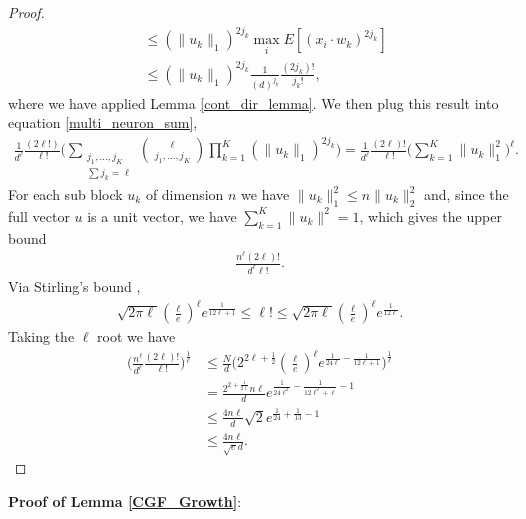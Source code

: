 \documentclass{article}
\numberwithin{equation}{section}
\theoremstyle{Lemma}
\theoremstyle{Corollary}
\theoremstyle{Theorem}
\theoremstyle{Remark}
\begin{document}
\begin{proof}
\begin{align}
     &\leq (\|u_{k}\|_{1})^{2j_{k}}\max_{i}E[(x_{i} \cdot w_{k})^{2j_{k}}]\\
     &\leq (\|u_{k}\|_{1})^{2j_{k}}
     \frac{1}{(d)^{j_{k}}}\frac{(2j_{k})!}{j_{k}!},
\end{align}
where we have applied Lemma \ref{cont_dir_lemma}. We then plug this result into equation \eqref{multi_neuron_sum},
\begin{align}
  \frac{1}{d^{\ell}}\frac{(2\ell!)}{\ell!}\Big(\sum_{\substack{j_{1}, \ldots, j_{K} \\ \sum j_{k} = \ell}}
  \binom{\ell}{j_{1},\ldots, j_{K}}\prod_{k=1}^{K}(\|u_{k}\|_{1})^{2j_{k}}\Big)=\frac{1}{d^{\ell}}\frac{(2\ell)!}{\ell!}\Big(\sum_{k=1}^{K}\|u_{k}\|_{1}^{2} \Big)^{\ell}.
\end{align}
For each sub block $u_{k}$ of dimension $n$ we have $\|u_{k}\|_{1}^{2} \leq n \|u_{k}\|^{2}_{2}$ and, since the full vector $u$ is a unit vector, we have $\sum_{k=1}^{K}\|u_{k}\|^{2} = 1$, which gives the upper bound
\begin{align}
    \frac{n^{\ell}(2\ell)!}{d^{\ell} \ell!}.
\end{align}
Via Stirling's bound \cite{robbins1955remark},
\begin{align}
     \sqrt{2\pi \ell} (\frac{\ell}{e})^{\ell}e^{\frac{1}{12\ell+1}}\leq \ell! \leq \sqrt{2\pi \ell} (\frac{\ell}{e})^{\ell}e^{\frac{1}{12\ell}}.
\end{align}
Taking the $\ell$ root we have
\begin{align}
    \Big(\frac{n^{\ell}}{d^{\ell}}\frac{(2\ell)!}{\ell!} \Big)^{\frac{1}{\ell}}& \leq \frac{N}{d} \Big(2^{2\ell+\frac{1}{2}} (\frac{\ell}{e})^{\ell}e^{\frac{1}{24\ell}-\frac{1}{12 \ell+1}}\Big)^{\frac{1}{\ell}}\\
    &= \frac{2^{2+\frac{1}{2\ell}}n \ell}{d} e^{\frac{1}{24 \ell^2}-\frac{1}{12 \ell^2+\ell}-1}\\
    & \leq \frac{4n\ell}{d}\sqrt{2}e^{\frac{1}{24}+\frac{1}{13}-1}\\
    & \leq \frac{4 n\ell}{\sqrt{e} d}.
\end{align}
\end{proof}

\textbf{Proof of Lemma  \ref{CGF_Growth}}:
\end{document}
